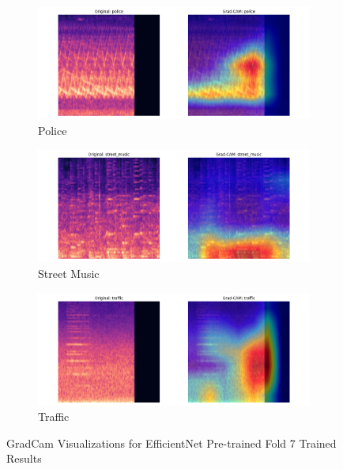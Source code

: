 \documentclass[11pt]{article}
\begin{document}
\begin{figure}[ht]
\begin{subfigure}[b]{0.24\textwidth}
        \centering
        \includegraphics[width=\textwidth]{latex/assets/efficientnet_fold7_gradcam/gradcam_police_0.png}
        \caption{Police}
    \end{subfigure}
    \hfill
    \begin{subfigure}[b]{0.24\textwidth}
        \centering
        \includegraphics[width=\textwidth]{latex/assets/efficientnet_fold7_gradcam/gradcam_street_music_0.png}
        \caption{Street Music}
    \end{subfigure}
    \hfill
    \begin{subfigure}[b]{0.24\textwidth}
        \centering
        \includegraphics[width=\textwidth]{latex/assets/efficientnet_fold7_gradcam/gradcam_traffic_0.png}
        \caption{Traffic}
    \end{subfigure}
    
    \caption{GradCam Visualizations for EfficientNet Pre-trained Fold 7 Trained Results}
\end{figure}
\end{document}
